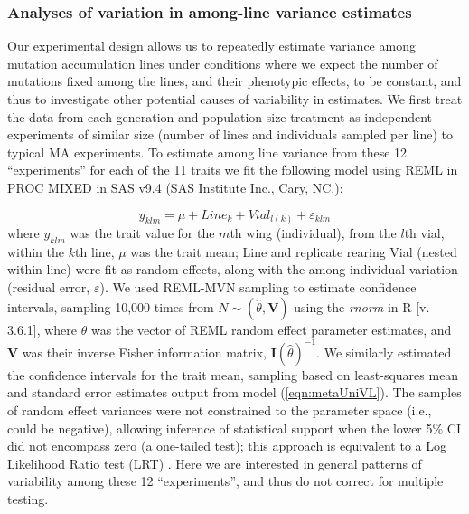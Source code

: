 \subsubsection{Analyses of variation in among-line variance estimates} 
Our experimental design allows us to repeatedly estimate variance among mutation accumulation lines under conditions where we expect the number of mutations fixed among the lines, and their phenotypic effects, to be constant, and thus to investigate other potential causes of variability in estimates. We first treat the data from each generation and population size treatment as independent experiments of similar size (number of lines and individuals sampled per line) to typical MA experiments. To estimate among line variance from these 12 “experiments” for each of the 11 traits we fit the following model using REML in PROC MIXED in SAS v9.4 (SAS Institute Inc., Cary, NC.): \par
\begin{equation}
\label{eqn:metaUniVL}
y_{klm}=\mu + Line_k + Vial_{l(k)} + \varepsilon_{klm}
\end{equation}
\noindent where $y_{klm}$ was the trait value for the $m$th wing (individual), from the $l$th vial, within the $k$th line, $\mu$ was the trait mean; Line and replicate rearing Vial (nested within line) were fit as random effects, along with the among-individual variation (residual error, $\varepsilon$). We used REML-MVN sampling \citep{Meye13,Houl15,Szte17a} to estimate confidence intervals, sampling 10,000 times from $N\sim(\hat\theta,\mathbf{V})$ using the \textit{rnorm} in R [v. 3.6.1], where $\hat\theta$ was the vector of REML random effect parameter estimates, and $\mathbf{V}$ was their inverse Fisher information matrix, $\bm{I}(\hat\theta)^{-1}$. We similarly estimated the confidence intervals for the trait mean, sampling based on least-squares mean and standard error estimates output from model (\ref{eqn:metaUniVL}). The samples of random effect variances were not constrained to the parameter space (i.e., could be negative), allowing inference of statistical support when the lower 5\% CI did not encompass zero (a one-tailed test); this approach is equivalent to a Log Likelihood Ratio test (LRT) \citep{Duga21}. Here we are interested in general patterns of variability among these 12 “experiments”, and thus do not correct for multiple testing.\par

